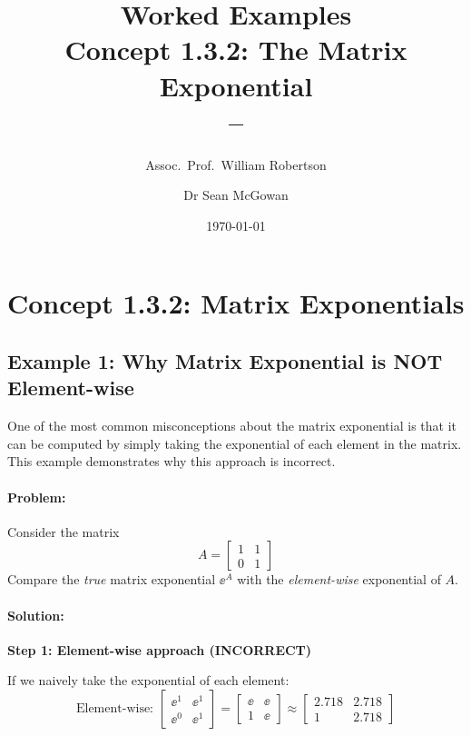\documentclass[11pt,a4paper]{article}
\title{\textbf{Worked Examples}\\[0.5em]
\large Concept 1.3.2: The Matrix Exponential\\[0.3em]
\normalsize \coursesubtitle{} -- \coursetitle}
\author{Assoc.\ Prof.\ William Robertson \and Dr Sean McGowan}
\date{\today}
\begin{document}
\maketitle
\tableofcontents
\newpage

\section{Concept 1.3.2: Matrix Exponentials}

\subsection{Example 1: Why Matrix Exponential is NOT Element-wise}

One of the most common misconceptions about the matrix exponential is that it can be computed by simply taking the exponential of each element in the matrix. This example demonstrates why this approach is incorrect.

\paragraph{Problem:} 
Consider the matrix 
\begin{equation}
	A = \begin{bmatrix} 1 & 1 \\ 0 & 1 \end{bmatrix}
\end{equation}
Compare the \emph{true} matrix exponential $\ee^A$ with the \emph{element-wise} exponential of $A$.

\paragraph{Solution:}

\textbf{Step 1: Element-wise approach (INCORRECT)}

If we naively take the exponential of each element:
\begin{equation}
	\text{Element-wise: } \begin{bmatrix} \ee^1 & \ee^1 \\ \ee^0 & \ee^1 \end{bmatrix} = \begin{bmatrix} \ee & \ee \\ 1 & \ee \end{bmatrix} \approx \begin{bmatrix} 2.718 & 2.718 \\ 1 & 2.718 \end{bmatrix}
\end{equation}
\end{document}
